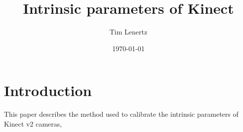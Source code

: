 \documentclass{scrartcl}
\title{Intrinsic parameters of Kinect}
\author{Tim Lenertz}
\date{\today}
\begin{document}
\maketitle

\section{Introduction}
This paper describes the method used to calibrate the intrinsic parameters of Kinect v2 cameras, 
\end{document}

